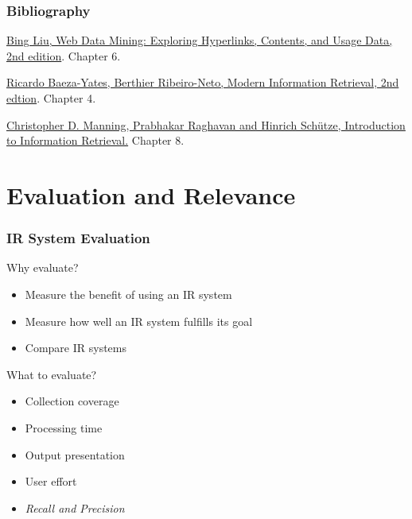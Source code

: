 \documentclass[svgnames]{beamer}
\subtitle{Evaluation of IR and IE Systems}
\begin{document}
\maketitle

\begin{frame} \frametitle{Bibliography}

   \begin{block}{}

        \href{http://www.cs.uic.edu/~liub/WebMiningBook.html}{Bing Liu, Web Data Mining: Exploring Hyperlinks, Contents, and
         Usage Data, 2nd edition}.  Chapter 6.  
    
    \end{block}

   \begin{block}{}

    \href{http://www.mir2ed.org/}{Ricardo Baeza-Yates,
            Berthier Ribeiro-Neto, Modern Information Retrieval, 2nd
            edtion}. Chapter 4.

    \end{block}

   \begin{block}{}

    \href{http://nlp.stanford.edu/IR-book/}{Christopher D. Manning, Prabhakar Raghavan and Hinrich Schütze, Introduction to Information Retrieval.} Chapter 8.

    \end{block}
    
\end{frame}



\section{Evaluation and Relevance}

\begin{frame} \frametitle{IR System Evaluation}
  
  \begin{block}{Why evaluate?}
      \begin{itemize}
      \item Measure the benefit of using an IR system
      \item Measure how well an IR system fulfills its goal
      \item Compare IR systems
      \end{itemize}

  \end{block}

  \begin{block}{What to evaluate?}
      \begin{itemize}
      \item Collection coverage
      \item Processing time
      \item Output presentation
      \item User effort
      \item \emph{Recall and Precision}
      \end{itemize}
  \end{block}

\end{frame}
\end{document}

